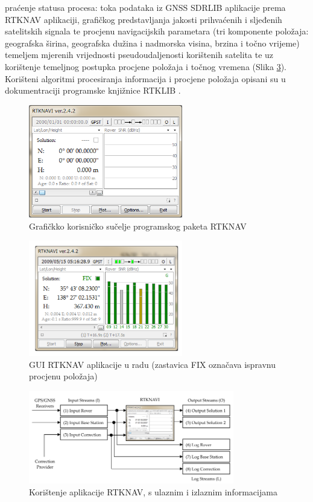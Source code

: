 \documentclass[a4paper,twoside,12pt]{memoir} %
\begin{document}
praćenje statusa procesa: toka podataka iz GNSS SDRLIB aplikacije prema RTKNAV aplikaciji,
grafičkog predstavljanja jakosti prihvaćenih i sljeđenih satelitskih signala te procjenu navigacijskih
parametara (tri komponente položaja: geografska širina, geografska dužina i nadmorska visina,
brzina i točno vrijeme) temeljem mjerenih vrijednosti pseudoudaljenosti korištenih
satelita te uz korištenje temeljnog postupka procjene položaja i točnog
vremena (Slika \ref{Fig:rtkNavKo}). 
Korišteni algoritmi procesiranja informacija i procjene
položaja opisani su u dokumentraciji programske knjižnice RTKLIB \cite{ref:36}.
\begin{figure}[H]
	\centering
	\includegraphics[width=0.6\textwidth]{rtkNav}
	\caption{Grafičkko korisničko sučelje programskog paketa RTKNAV}
	\label{Fig:rtkNav}	
\end{figure}
\begin{figure}[H]
	\centering
	\includegraphics[width=0.6\textwidth]{guirtkNav}
	\caption{GUI RTKNAV aplikacije u radu (zastavica FIX označava ispravnu procjenu položaja)}
	\label{Fig:guirtkNav}	
\end{figure}
\begin{figure}[H]
	\centering
	\includegraphics[width=0.8\textwidth]{rtkNavKo}
	\caption{Korištenje aplikacije RTKNAV, s ulaznim i izlaznim informacijama}
	\label{Fig:rtkNavKo}	
\end{figure}
\end{document}
